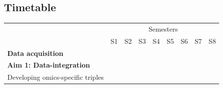 \documentclass[twoside,fontsize=10pt]{article}
\begin{document}
\subsection*{Timetable}

\begin{table}[h]
\begin{center}
\begin{tabular}{lllllllll}
                                                & \multicolumn{8}{c}{Semesters}                                                                                                                                                                                                                                                                                                                                                                                 \\ \cline{2-9} 
                                                & S1                                              & S2                                              & S3                                              & S4                                              & S5                                              & S6                                              & S7                                              & S8                                              \\ \hline
\textbf{Data acquisition}                       & \cellcolor[HTML]{343434}{\color[HTML]{656565} } & \cellcolor[HTML]{343434}{\color[HTML]{656565} } & \cellcolor[HTML]{343434}{\color[HTML]{656565} } & \cellcolor[HTML]{343434}{\color[HTML]{656565} } & \cellcolor[HTML]{343434}{\color[HTML]{656565} } & \cellcolor[HTML]{343434}{\color[HTML]{656565} } & \cellcolor[HTML]{343434}{\color[HTML]{656565} } & \cellcolor[HTML]{343434}{\color[HTML]{656565} } \\
\textbf{Aim 1: Data-integration}                & \cellcolor[HTML]{343434}                        & \cellcolor[HTML]{343434}                        & \cellcolor[HTML]{343434}                        &                                                 &                                                 &                                                 &                                                 &                                                 \\
\hspace*{1em} Developing omics-specific triples & \cellcolor[HTML]{656565}                        &                                                 &                                                 &                                                 &                                                 &                                                 &                                                 &                                                 \\

\end{tabular}
\end{center}
\end{table}
\end{document}
